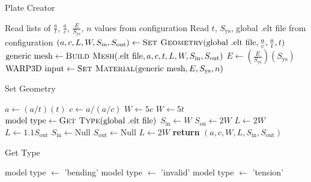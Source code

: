 \documentclass{article}
\begin{document}
\begin{algorithm}
  \caption{Plate Creator}
  \label{plate_creator}
  \begin{algorithmic}
     
    \State Read lists of $\frac{a}{t}$, $\frac{a}{c}$, $\frac{E}{S_{\text{ys}}}$, $n$ values from configuration
    \State Read $t$, $S_\text{ys}$, global .elt file from configuration
        \State $(a, c, L, W, S_{\text{in}}, S_{\text{out}}) \gets \Call{Set Geometry}{\text{global .elt file}, \frac{a}{c}, \frac{a}{t}, t}$
        \State $\text{generic mesh} \gets \Call{Build Mesh}{\text{.elt file}, a, c, t, L, W, S_{\text{in}}, S_{\text{out}}}$
          \State $E \gets (\frac{E}{S_{\text{ys}}})(S_{\text{ys}})$
            \State $\text{WARP3D input} \gets \Call{Set Material}{\text{generic mesh}, E, S_{\text{ys}}, n}$
          \EndFor
        \EndFor
      \EndFor
    \EndFor
    \EndProcedure
  \end{algorithmic}
\end{algorithm}

\begin{algorithm}
  \caption{Set Geometry}
  \label{set_geometry}
  \begin{algorithmic}
    \State $a \gets (a/t)(t)$
    \State $c \gets a/(a/c)$
      \State $W \gets 5c$
    \Else
      \State $W \gets 5t$
    \EndIf
    \State $\text{model type} \gets \Call{Get Type}{\text{global .elt file}}$
      \State $S_{\text{in}} \gets W$
      \State $S_{\text{ou}} \gets 2W$
        \State $L \gets 2 W$
      \Else
        \State $L \gets 1.1 S_{\text{out}}$
      \EndIf
    \Else
      \State $S_{\text{in}} \gets \text{Null}$
      \State $S_{\text{out}} \gets \text{Null}$
      \State $L \gets 2 W$
    \EndIf
    \State \textbf{return} $(a, c, W, L, S_{\text{in}}, S_{\text{out}})$
    \EndProcedure
  \end{algorithmic}
\end{algorithm}

\begin{algorithm}
  \caption{Get Type}
  \label{get_type}
  \begin{algorithmic}
            \State model type $\gets$ 'bending'
          \Else
            \State model type $\gets$ 'invalid'
          \EndIf
        \EndIf
      \Else
        \State model type $\gets$ 'tension'
      \EndIf
    \EndProcedure
  \end{algorithmic}
\end{algorithm}
\end{document}
